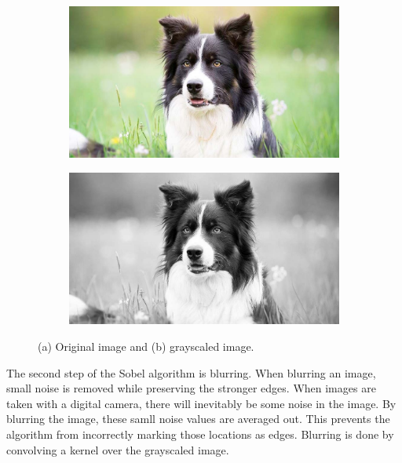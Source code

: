 \documentclass[12pt]{article}
\begin{document}
			\begin{figure}[H]
				\centering
				\begin{subfigure}[b]{0.45\linewidth}
					\includegraphics[width=1\linewidth,keepaspectratio]{../examples/dog/bc}
					\subcaption{}
					\label{fig:gaussian9x9orig}
				\end{subfigure} %
				\begin{subfigure}[b]{0.45\linewidth}
					\includegraphics[width=1\linewidth,keepaspectratio]{../examples/dog/dog_gray}
					\subcaption{}
					\label{fig:gaussian9x9blur}
				\end{subfigure} %
				\caption{\small (a) Original image and (b) grayscaled image.}
				\label{fig:grayscale}
			\end{figure} %

			The second step of the Sobel algorithm is blurring. When blurring an image, small noise is removed while preserving the stronger edges. When images are taken with a digital camera, there will inevitably be some noise in the image. By blurring the image, these samll noise values are averaged out. This prevents the algorithm from incorrectly marking those locations as edges. Blurring is done by convolving a kernel over the grayscaled image.
\end{document}
